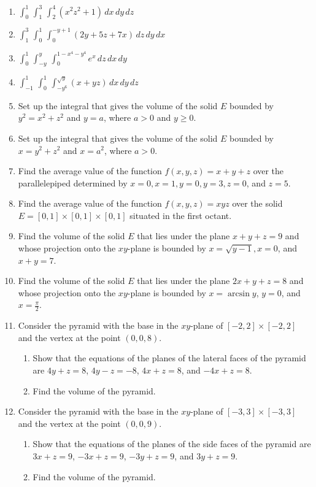 \documentclass{exercises}
\begin{document}
\begin{enumerate}[resume]
\item $\int_{0}^{1}\,\int_{1}^{3}\,\int_{2}^{4}(x^{2}z^{2}+1)\,dx\,dy\,dz$
\item $\int_{1}^{3}\,\int_{0}^{1}\,\int_{0}^{-y+1}(2y+5z+7x)\,dz\,dy\,dx$
\item $\int_{0}^{1}\,\int_{-y}^{y}\,\int_{0}^{1-x^{4}-y^{4}}e^{x}\,dz\,dx\,dy$
\item $\int_{-1}^{1}\,\int_{0}^{1}\,\int_{-y^{6}}^{\sqrt{y}}(x+yz)\,dx\,dy\,dz$
\item Set up the integral that gives the volume of the solid $E$ bounded by $y^{2}=x^{2}+z^{2}$ and $y=a$, where $a>0$ and $y\ge0$.
\item Set up the integral that gives the volume of the solid $E$ bounded by $x=y^{2}+z^{2}$ and $x=a^{2}$, where $a>0$.
\item Find the average value of the function $f(x,y,z)=x+y+z$ over the parallelepiped determined by $x=0,x=1,y=0,y=3,z=0$, and $z=5$.
\item Find the average value of the function $f(x,y,z)=xyz$ over the solid $E=[0,1]\times [0,1]\times [0,1]$ situated in the first octant.
\item Find the volume of the solid $E$ that lies under the plane $x+y+z=9$ and whose projection onto the $xy$-plane is bounded by $x=\sqrt{y-1},x=0$, and $x+y=7$.
\item Find the volume of the solid $E$ that lies under the plane $2x+y+z=8$ and whose projection onto the $xy$-plane is bounded by $x=\arcsin y$, $y=0$, and $x=\frac{\pi}{2}$.
\item Consider the pyramid with the base in the $xy$-plane of $[-2,2]\times [-2,2]$ and the vertex at the point $(0,0,8)$.
\begin{enumerate}[label=(\alph*)]
  \item Show that the equations of the planes of the lateral faces of the pyramid are $4y+z=8$, $4y-z=-8$, $4x+z=8$, and $-4x+z=8$.
  \item Find the volume of the pyramid.
\end{enumerate}
\item Consider the pyramid with the base in the $xy$-plane of $[-3,3]\times [-3,3]$ and the vertex at the point $(0,0,9)$.
\begin{enumerate}[label=(\alph*)]
  \item Show that the equations of the planes of the side faces of the pyramid are $3x+z=9$, $-3x+z=9$, $-3y+z=9$, and $3y+z=9$.
  \item Find the volume of the pyramid.

\end{enumerate}
\end{enumerate}
\end{document}
